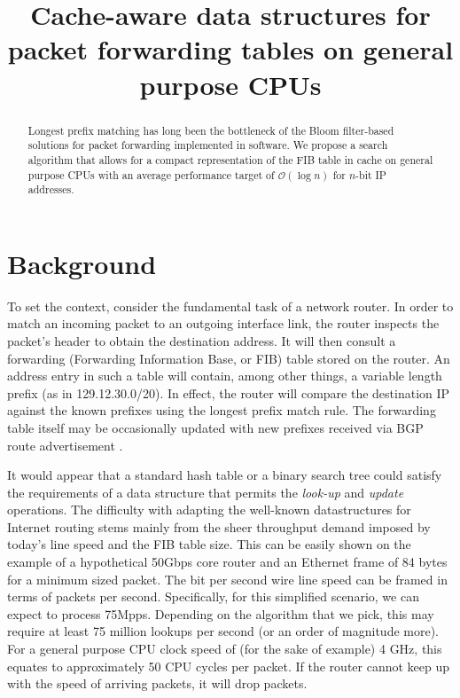 \documentclass[conference,compsoc]{IEEEtran}
\begin{document}
\title{Cache-aware data structures for packet forwarding tables on general purpose CPUs}
\author{
}

\maketitle

\begin{abstract}
Longest prefix matching has long been the bottleneck of the Bloom 
filter-based solutions for packet forwarding implemented in software. We propose
a search algorithm that allows for a compact representation of the FIB table
in cache on general purpose CPUs with an average performance target
of $\mathcal{O}(\log n)$ for $n$-bit IP addresses.

\end{abstract}

\section{Background}
To set the context, consider the fundamental task of a network router.
In order to match an incoming packet to an outgoing interface link,
the router inspects the packet's header to obtain the destination address.
It will then consult a forwarding (Forwarding Information Base, or FIB) table 
stored on the router.
An address entry in such a table will contain, among other things,
a variable length prefix (as in 129.12.30.0/20).
In effect, the router will compare the destination IP
against the known prefixes using the longest prefix match rule.
The forwarding table itself may be occasionally updated with new prefixes
received via BGP route advertisement \cite{Kurose:Networking}.

It would appear that a standard hash table or a binary search tree could
satisfy the requirements of a data structure that permits the 
\textit{look-up} and \textit{update} operations. The difficulty with 
adapting the well-known 
datastructures for Internet routing stems mainly from the sheer throughput
demand imposed by today's line speed and the FIB table size.
This can be easily shown on the example of a hypothetical 50Gbps core router 
and an Ethernet frame of 84 bytes for a minimum sized packet. 
The bit per second 
wire line speed can be framed in terms of packets per second. Specifically,
for this simplified scenario, we can expect to process 75Mpps. Depending on
the algorithm that we pick, this may require at least 75 million lookups 
per second (or an order of magnitude more). For a general purpose CPU clock
speed of (for the sake of example) 4 GHz, this equates to approximately 
50 CPU cycles per packet. If the router cannot keep up with the speed of
arriving packets, it will drop packets.
\end{document}
